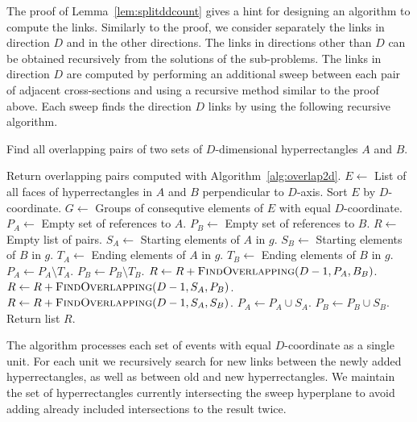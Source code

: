 \documentclass[english,gradu]{tktltiki2018}
\begin{document}
The proof of Lemma~\ref{lem:splitddcount} gives a hint for designing an algorithm to compute the links.
Similarly to the proof, we consider separately the links in direction $D$ and in the other directions.
The links in directions other than $D$ can be obtained recursively from the solutions of the sub-problems.
The links in direction $D$ are computed by performing an additional sweep between each pair of adjacent cross-sections and using a recursive method similar to the proof above.
Each sweep finds the direction $D$ links by using the following recursive algorithm.

\begin{alg}\label{alg:overlapdd}
Find all overlapping pairs of two sets of $D$-dimensional hyperrectangles $A$ and $B$.
\begin{algorithmic}
		\State Return overlapping pairs computed with Algorithm~\ref{alg:overlap2d}.
	\EndIf
	\State $E\gets$ List of all faces of hyperrectangles in $A$ and $B$ perpendicular to $D$-axis.
	\State Sort $E$ by $D$-coordinate.
	\State $G\gets$ Groups of consequtive elements of $E$ with equal $D$-coordinate.
	\State $P_A\gets$ Empty set of references to $A$.
	\State $P_B\gets$ Empty set of references to $B$.
	\State $R\gets$ Empty list of pairs.
		\State $S_A\gets$ Starting elements of $A$ in $g$.
		\State $S_B\gets$ Starting elements of $B$ in $g$.
		\State $T_A\gets$ Ending elements of $A$ in $g$.
		\State $T_B\gets$ Ending elements of $B$ in $g$.
		\State $P_A\gets P_A\setminus T_A$.
		\State $P_B\gets P_B\setminus T_B$.
		\State $R\gets R + \textsc{FindOverlapping}(D-1,P_A,B_B)$.
		\State $R\gets R + \textsc{FindOverlapping}(D-1,S_A,P_B)$.
		\State $R\gets R + \textsc{FindOverlapping}(D-1,S_A,S_B)$.
		\State $P_A\gets P_A\cup S_A$.
		\State $P_B\gets P_B\cup S_B$.
	\EndFor
	\State Return list $R$.
\EndProcedure
\end{algorithmic}
\end{alg}

The algorithm processes each set of events with equal $D$-coordinate as a single unit.
For each unit we recursively search for new links between the newly added hyperrectangles, as well as between old and new hyperrectangles.
We maintain the set of hyperrectangles currently intersecting the sweep hyperplane to avoid adding already included intersections to the result twice.
\end{document}
